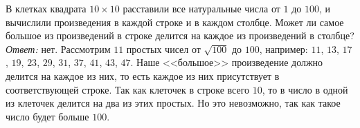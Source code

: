 \problem
В клетках квадрата $10 \times 10$ расставили все натуральные числа от $1$ до
$100$, и вычислили произведения в каждой строке и в каждом столбце.
Может ли самое большое из произведений в строке делится на каждое из
произведений в столбце?
\solution
\emph{Ответ:} нет.
Рассмотрим $11$ простых чисел от $\sqrt{100}$ до $100$, например:
$11$, $13$, $17$, $19$, $23$, $29$, $31$, $37$, $41$, $43$, $47$.
Наше <<большое>> произведение должно делится на каждое из них, то есть каждое из
них присутствует в соответствующей строке.
Так как клеточек в строке всего $10$, то в число в одной из клеточек делится на
два из этих простых.
Но это невозможно, так как такое число будет больше $100$.
\endproblem
